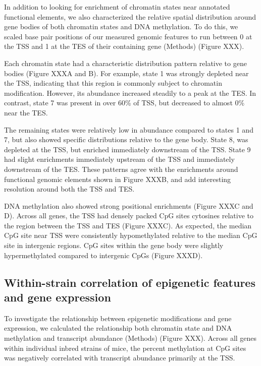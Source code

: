 \documentclass[10pt,letterpaper]{article}
\begin{document}
In addition to looking for enrichment of chromatin states near annotated
functional elements, we also characterized the relative spatial
distribution around gene bodies of both chromatin states and DNA
methylation. To do this, we scaled base pair positions of our measured
genomic features to run between 0 at the TSS and 1 at the TES of their
containing gene (Methods) (Figure XXX).

Each chromatin state had a characteristic distribution pattern relative
to gene bodies (Figure XXXA and B). For example, state 1 was strongly
depleted near the TSS, indicating that this region is commonly subject
to chromatin modification. However, its abundance increased steadily to
a peak at the TES. In contrast, state 7 was present in over 60\% of TSS,
but decreased to almost 0\% near the TES.

The remaining states were relatively low in abundance compared to states
1 and 7, but also showed specific distributions relative to the gene
body. State 8, was depleted at the TSS, but enriched immediately
downstream of the TSS. State 9 had slight enrichments immediately
upstream of the TSS and immediately downstream of the TES. These
patterns agree with the enrichments around functional genomic elements
shown in Figure XXXB, and add interesting resolution around both the TSS
and TES.

DNA methylation also showed strong positional enrichments (Figure XXXC
and D). Across all genes, the TSS had densely packed CpG sites cytosines
relative to the region between the TSS and TES (Figure XXXC). As
expected, the median CpG site near TSS were consistently hypomethylated
relative to the median CpG site in intergenic regions. CpG sites within
the gene body were slightly hypermethylated compared to intergenic CpGs
(Figure XXXD).

\hypertarget{within-strain-correlation-of-epigenetic-features-and-gene-expression}{%
\subsection{Within-strain correlation of epigenetic features and gene
expression}\label{within-strain-correlation-of-epigenetic-features-and-gene-expression}}

To investigate the relationship between epigenetic modifications and
gene expression, we calculated the relationship both chromatin state and
DNA methylation and transcript abundance (Methods) (Figure XXX). Across
all genes within individual inbred strains of mice, the percent
methylation at CpG sites was negatively correlated with transcript
abundance primarily at the TSS.
\end{document}
